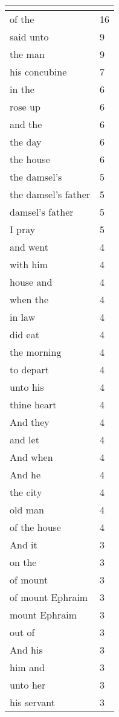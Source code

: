 \begin{center}
\begin{longtable}{|p{3.0in}|p{0.5in}|}
\hline \multicolumn{2}{c}{{ }} \\ \hline
\endfoot 
of the & 16\\ \hline 
said unto & 9\\ \hline 
the man & 9\\ \hline 
his concubine & 7\\ \hline 
in the & 6\\ \hline 
rose up & 6\\ \hline 
and the & 6\\ \hline 
the day & 6\\ \hline 
the house & 6\\ \hline 
the damsel's & 5\\ \hline 
the damsel's father & 5\\ \hline 
damsel's father & 5\\ \hline 
I pray & 5\\ \hline 
and went & 4\\ \hline 
with him & 4\\ \hline 
house and & 4\\ \hline 
when the & 4\\ \hline 
in law & 4\\ \hline 
did eat & 4\\ \hline 
the morning & 4\\ \hline 
to depart & 4\\ \hline 
unto his & 4\\ \hline 
thine heart & 4\\ \hline 
And they & 4\\ \hline 
and let & 4\\ \hline 
And when & 4\\ \hline 
And he & 4\\ \hline 
the city & 4\\ \hline 
old man & 4\\ \hline 
of the house & 4\\ \hline 
And it & 3\\ \hline 
on the & 3\\ \hline 
of mount & 3\\ \hline 
of mount Ephraim & 3\\ \hline 
mount Ephraim & 3\\ \hline 
out of & 3\\ \hline 
And his & 3\\ \hline 
him and & 3\\ \hline 
unto her & 3\\ \hline 
his servant & 3\\ \hline 

\end{longtable}
\end{center}

